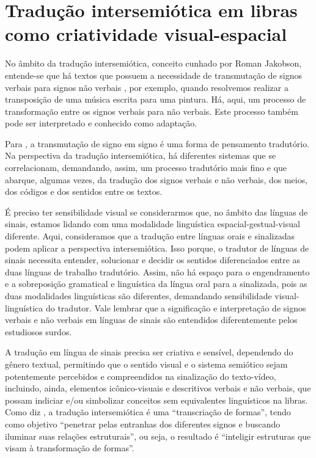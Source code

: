 \documentclass[portuguese]{textolivre}
\begin{document}
\section{Tradução intersemiótica em libras como criatividade visual-espacial}\label{sec-conduta}
No âmbito da tradução intersemiótica, conceito cunhado por Roman Jakobson, entende-se que há textos que possuem a necessidade de transmutação de signos verbais para signos não verbais \cite{plaza2013intersemiotica,menezes2018traducao}, por exemplo, quando resolvemos realizar a transposição de uma música escrita para uma pintura. Há, aqui, um processo de transformação entre os signos verbais para não verbais. Este processo também pode ser interpretado e conhecido como adaptação. 

Para \textcite[p. 18]{plaza2013intersemiotica}, a transmutação de signo em signo é uma forma de pensamento tradutório. Na perspectiva da tradução intersemiótica, há diferentes sistemas que se correlacionam, demandando, assim, um processo tradutório mais fino e que abarque, algumas vezes, da tradução dos signos verbais e não verbais, dos meios, dos códigos e dos sentidos entre os textos. 

É preciso ter sensibilidade visual se considerarmos que, no âmbito das línguas de sinais, estamos lidando com uma modalidade linguística espacial-gestual-visual diferente. Aqui, consideramos que a tradução entre línguas orais e sinalizadas podem aplicar a perspectiva intersemiótica. Isso porque, o tradutor de línguas de sinais necessita entender, solucionar e decidir os sentidos diferenciados entre as duas línguas de trabalho tradutório. Assim, não há espaço para o engendramento e a sobreposição gramatical e linguística da língua oral para a sinalizada, pois as duas modalidades linguísticas são diferentes, demandando sensibilidade visual-linguística do tradutor. Vale lembrar que a significação e interpretação de signos verbais e não verbais em línguas de sinais são entendidos diferentemente pelos estudiosos surdos. 

A tradução em língua de sinais precisa ser criativa \cite{nascimento2017traducao} e sensível, dependendo do gênero textual, permitindo que o sentido visual e o sistema semiótico sejam potentemente percebidos e compreendidos na sinalização do texto-vídeo, incluindo, ainda, elementos icônico-visuais e descritivos verbais e não verbais, que possam indiciar e/ou simbolizar conceitos sem equivalentes linguísticos na libras. Como diz \textcite[p. 71]{plaza2013intersemiotica}, a tradução intersemiótica é uma “transcriação de formas”, tendo como objetivo “penetrar pelas entranhas dos diferentes signos e buscando iluminar suas relações estruturais”, ou seja, o resultado é “inteligir estruturas que visam à transformação de formas”.
\end{document}
